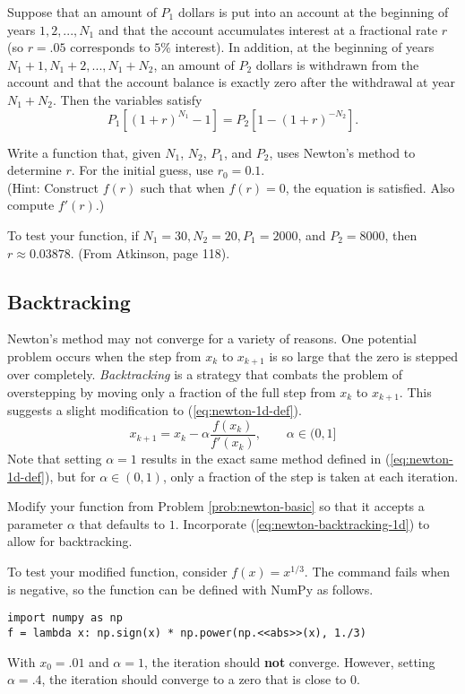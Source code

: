 \begin{problem} %
\label{prob:newton-interest}
Suppose that an amount of $P_1$ dollars is put into an account at the beginning of years $1, 2,..., N_1$ and that the account accumulates interest at a fractional rate $r$ (so $r = .05$ corresponds to $5\%$ interest).
In addition, at the beginning of years $N_1 + 1, N_1 + 2, ..., N_1 + N_2$, an amount of $P_2$ dollars is withdrawn from the account and that the account balance is exactly zero after the withdrawal at year $N_1 + N_2$.
Then the variables satisfy
\[
P_1[(1+r)^{N_1} - 1] = P_2[1-(1+r)^{-N_2}].
\]

Write a function that, given $N_1$, $N_2$, $P_1$, and $P_2$, uses Newton's method to determine $r$.
For the initial guess, use $r_0 = 0.1$.
\\(Hint: Construct $f(r)$ such that when $f(r)=0$, the equation is satisfied.
Also compute $f'(r)$.)

To test your function, if $N_1 =30, N_2 =20, P_1 =2000$, and $P_2 =8000$, then $r\approx 0.03878$.
(From Atkinson, page 118). %
\end{problem}

\subsection*{Backtracking} %

Newton's method may not converge for a variety of reasons.
One potential problem occurs when the step from $x_k$ to $x_{k+1}$ is so large that the zero is stepped over completely.
\emph{Backtracking} is a strategy that combats the problem of overstepping by moving only a fraction of the full step from $x_k$ to $x_{k+1}$.
This suggests a slight modification to (\ref{eq:newton-1d-def}).
\begin{equation}
x_{k+1} = x_k - \alpha\frac{f(x_k)}{f'(x_k)},\qquad\alpha\in(0,1]
\label{eq:newton-backtracking-1d}
\end{equation}
Note that setting $\alpha = 1$ results in the exact same method defined in (\ref{eq:newton-1d-def}), but for $\alpha \in (0,1)$, only a fraction of the step is taken at each iteration.

\begin{problem} %
Modify your function from Problem \ref{prob:newton-basic} so that it accepts a parameter $\alpha$ that defaults to $1$.
Incorporate (\ref{eq:newton-backtracking-1d}) to allow for backtracking.

To test your modified function, consider $f(x)=x^{1/3}$.
The command  fails when  is negative, so the function can be defined with NumPy as follows.
\begin{lstlisting}
import numpy as np
f = lambda x: np.sign(x) * np.power(np.<<abs>>(x), 1./3)
\end{lstlisting}
With $x_0=.01$ and $\alpha=1$, the iteration should \textbf{not} converge.
However, setting $\alpha=.4$, the iteration should converge to a zero that is close to $0$.
\label{prob:newton-1d-backtracking}
\end{problem}

